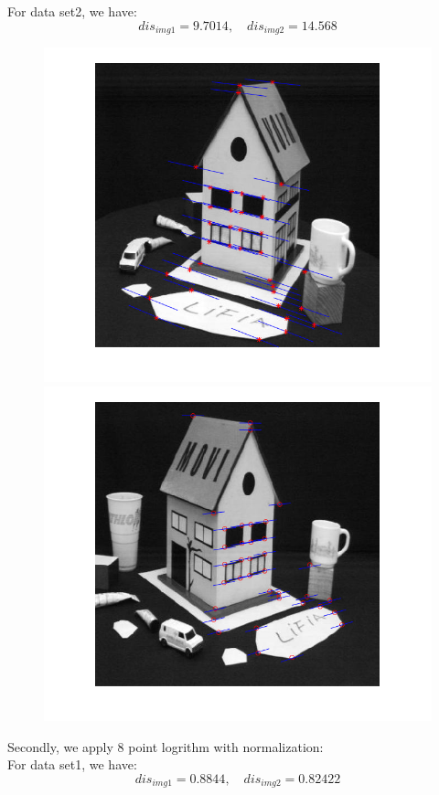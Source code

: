 \documentclass[letterpaper]{article}
\begin{document}
For data set2, we have:
$$dis_{img1} = 9.7014,\quad dis_{img2} = 14.568$$
\begin{figure}[H]
	\centering
	\includegraphics[scale=0.4]{wo3.png}\includegraphics[scale=0.4]{wo4.png}
\end{figure}
Secondly, we apply 8 point logrithm with normalization:\\
For data set1, we have:
$$dis_{img1} = 0.8844,\quad dis_{img2} = 0.82422$$
\end{document}
